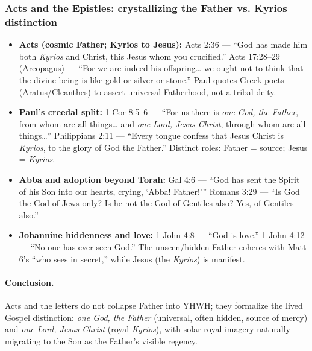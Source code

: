 \subsubsection{Acts and the Epistles: crystallizing the Father vs. Kyrios distinction}\label{subsubsec:acts-epistles-father-kyrios}
\begin{itemize}
  \item \textbf{Acts (cosmic Father; Kyrios to Jesus):} Acts 2:36 — “God has made him both \emph{Kyrios} and Christ, this Jesus whom you crucified.” Acts 17:28–29 (Areopagus) — “For we are indeed his offspring… we ought not to think that the divine being is like gold or silver or stone.” Paul quotes Greek poets (Aratus/Cleanthes) to assert universal Fatherhood, not a tribal deity.
  \item \textbf{Paul’s creedal split:} 1 Cor 8:5–6 — “For us there is \emph{one God, the Father}, from whom are all things… and \emph{one Lord, Jesus Christ}, through whom are all things…” Philippians 2:11 — “Every tongue confess that Jesus Christ is \emph{Kyrios}, to the glory of God the Father.” Distinct roles: Father = source; Jesus = \emph{Kyrios}.
  \item \textbf{Abba and adoption beyond Torah:} Gal 4:6 — “God has sent the Spirit of his Son into our hearts, crying, ‘Abba! Father!’” Romans 3:29 — “Is God the God of Jews only? Is he not the God of Gentiles also? Yes, of Gentiles also.”
  \item \textbf{Johannine hiddenness and love:} 1 John 4:8 — “God is love.” 1 John 4:12 — “No one has ever seen God.” The unseen/hidden Father coheres with Matt 6’s “who sees in secret,” while Jesus (the \emph{Kyrios}) is manifest.
\end{itemize}
\paragraph{Conclusion.} Acts and the letters do not collapse Father into YHWH; they formalize the lived Gospel distinction: \emph{one God, the Father} (universal, often hidden, source of mercy) and \emph{one Lord, Jesus Christ} (royal \emph{Kyrios}), with solar-royal imagery naturally migrating to the Son as the Father’s visible regency.
